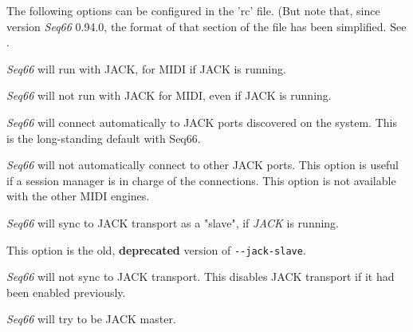 
   The following options can be configured in the 'rc' file. (But note that,
   since version \textsl{Seq66} 0.94.0, the format of that section of the file
   has been simplified.
   See .

      \textsl{Seq66} will run with JACK, for MIDI if JACK is running.


      \textsl{Seq66} will not run with JACK for MIDI, even if JACK is running.


      \textsl{Seq66} will connect automatically to JACK ports discovered on the
      system. This is the long-standing default with Seq66.


      \textsl{Seq66} will not automatically connect to other JACK ports.
      This option is useful if a session manager is in charge of the
      connections.
      This option is not available with the other MIDI engines.



      \textsl{Seq66} will sync to JACK transport as a "slave", if \textsl{JACK}
      is running.

      This option is the old, \textbf{deprecated} version of
      \texttt{-{}-jack-slave}.


      \textsl{Seq66} will not sync to JACK transport.
      This disables JACK transport if it had been enabled previously.


      \textsl{Seq66} will try to be JACK master.



